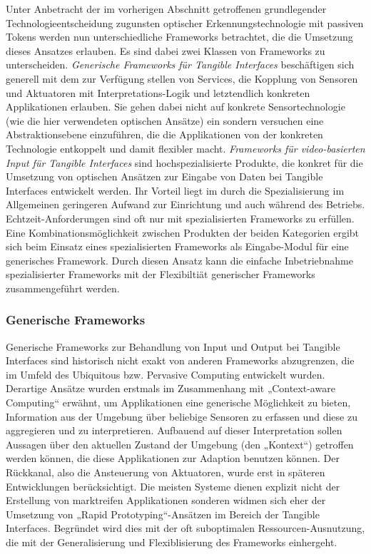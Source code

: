 Unter Anbetracht der im vorherigen Abschnitt getroffenen grundlegender Technologieentscheidung zugunsten optischer Erkennungstechnologie mit passiven Tokens werden nun unterschiedliche Frameworks betrachtet, die die Umsetzung dieses Ansatzes erlauben. Es sind dabei zwei Klassen von Frameworks zu unterscheiden. \emph{Generische Frameworks für Tangible Interfaces} beschäftigen sich generell mit dem zur Verfügung stellen von Services, die Kopplung von Sensoren und Aktuatoren mit Interpretations-Logik und letztendlich konkreten Applikationen erlauben. Sie gehen dabei nicht auf konkrete  Sensortechnologie (wie die hier verwendeten optischen Ansätze) ein sondern versuchen eine Abstraktionsebene einzuführen, die die Applikationen von der konkreten Technologie entkoppelt und damit flexibler macht. \emph{Frameworks für video-basierten Input für Tangible Interfaces} sind hochspezialisierte Produkte, die konkret für die Umsetzung von optischen Ansätzen zur Eingabe von Daten bei Tangible Interfaces entwickelt werden. Ihr Vorteil liegt im durch die Spezialisierung im Allgemeinen geringeren Aufwand zur Einrichtung und auch während des Betriebs. Echtzeit-Anforderungen sind oft nur mit spezialisierten Frameworks zu erfüllen. Eine Kombinationsmöglichkeit zwischen Produkten der beiden Kategorien ergibt sich beim Einsatz eines spezialisierten Frameworks als Eingabe-Modul für eine generisches Framework. Durch diesen Ansatz kann die einfache Inbetriebnahme spezialisierter Frameworks mit der Flexibiltiät generischer Frameworks zusammengeführt werden. 

\subsubsection{Generische Frameworks} %
\label{ssub:generische_frameworks}

Generische Frameworks zur Behandlung von Input und Output bei Tangible Interfaces sind historisch nicht exakt von anderen Frameworks abzugrenzen, die im Umfeld des Ubiquitous bzw. Pervasive Computing \citep{Weiser91} entwickelt wurden. Derartige Ansätze wurden erstmals im Zusammenhang mit „Context-aware Computing“ \citep{Schilit94} erwähnt, um Applikationen eine generische Möglichkeit zu bieten, Information aus der Umgebung über beliebige Sensoren zu erfassen und diese zu aggregieren und zu interpretieren. Aufbauend auf dieser Interpretation sollen Aussagen über den aktuellen Zustand der Umgebung (den „Kontext“) getroffen werden können, die diese Applikationen zur Adaption benutzen können. Der Rückkanal, also die Ansteuerung von Aktuatoren, wurde erst in späteren Entwicklungen berücksichtigt. Die meisten Systeme dienen explizit nicht der Erstellung von marktreifen Applikationen sonderen widmen sich eher der Umsetzung von „Rapid Prototyping“-Ansätzen im Bereich der Tangible Interfaces. Begründet wird dies mit der oft suboptimalen Ressourcen-Ausnutzung, die mit der Generalisierung und Flexiblisierung des Frameworks einhergeht. 


